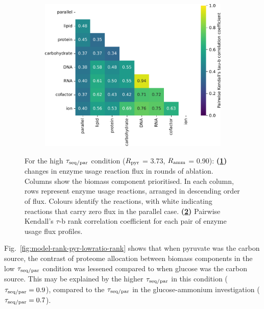 \begin{figure}
\begin{subfigure}[t]{0.45\textwidth}
    \caption{
    }
    \label{fig:model-rank-pyr-highratio-rank}
  \end{subfigure}%
  \begin{subfigure}[t]{0.45\textwidth}
  \centering
    \includegraphics[width=\linewidth]{CompareEnzUse_glc00p00_pyr03p73_amm00p90_2.pdf}
    \caption{
    }
    \label{fig:model-rank-pyr-highratio-kendall}
  \end{subfigure}

  \caption[
    Changes in enzyme usage reaction flux and Kendall's $\tau$-b rank correlation coefficient for each pair, $\exchrate{pyr}$ = \SI{3.73}{\mmolgdwh}, $\exchrate{amm}$ = \SI{0.90}{\mmolgdwh}.
  ]{
    For the high $\tau_{\mathrm{seq}/\mathrm{par}}$ condition ($\exchrate{pyr}$ = \SI{3.73}{\mmolgdwh}, $\exchrate{amm}$ = \SI{0.90}{\mmolgdwh}):
    \textbf{(\ref{fig:model-rank-pyr-highratio-rank})}
    changes in enzyme usage reaction flux in rounds of ablation.
    Columns show the biomass component prioritised.
    In each column, rows represent enzyme usage reactions, arranged in descending order of flux.
    Colours identify the reactions, with white indicating reactions that carry zero flux in the parallel case.
    \textbf{(\ref{fig:model-rank-pyr-highratio-kendall})}
    Pairwise Kendall's $\tau$-b rank correlation coefficient \parencite{kendallTREATMENTTIESRANKING1945} for each pair of enzyme usage flux profiles.
  }
  \label{fig:model-rank-pyr-highratio}
\end{figure}

Fig.\ \ref{fig:model-rank-pyr-lowratio-rank} shows that when pyruvate was the carbon source, the contrast of proteome allocation between biomass components in the low $\tau_{\mathrm{seq}/\mathrm{par}}$ condition was lessened compared to when glucose was the carbon source.
This may be explained by the higher $\tau_{\mathrm{seq}/\mathrm{par}}$ in this condition ($\tau_{\mathrm{seq}/\mathrm{par}} = 0.9$), compared to the $\tau_{\mathrm{seq}/\mathrm{par}}$ in the glucose-ammonium investigation ($\tau_{\mathrm{seq}/\mathrm{par}} = 0.7$).

